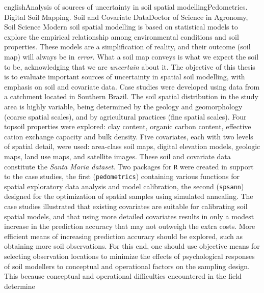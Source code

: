 \documentclass[tese, header, %
twoside, openright,          %
]{UFRuralRJ}
\begin{document}
\def\titleEn{Analysis of sources of uncertainty in soil spatial modelling}
\def\nivelEn{Doctor of Science in Agronomy, Soil Science}
\def\keyEn{Pedometrics. Digital Soil Mapping. Soil and Covariate Data}

\generalabstracttrue
\begin{generalabstract}{english}{\titleEn}{\keyEn}{\nivelEn}
Modern soil spatial modelling is based on statistical models to explore the empirical relationship among 
environmental conditions and soil properties. These models are a simplification of reality, and their outcome 
(soil map) will always be in \emph{error}. What a soil map conveys is what we expect the soil to be, 
acknowledging that we are \emph{uncertain} about it. The objective of this thesis is to evaluate important 
sources of uncertainty in spatial soil modelling, with emphasis on soil and covariate data. Case studies 
were developed using data from a catchment located in Southern Brazil. The soil spatial distribution in 
the study area is highly variable, being determined by the geology and geomorphology (coarse spatial 
scales), and by agricultural practices (fine spatial scales). Four topsoil properties were explored: clay 
content, organic carbon content, effective cation exchange capacity and bulk density. Five covariates, each 
with two levels of spatial detail, were used: area-class soil maps, digital elevation models, geologic maps, 
land use maps, and satellite images. These soil and covariate data constitute the \emph{Santa Maria dataset}. 
Two packages for \texttt{R} were created in support to the case studies, the first (\texttt{pedometrics}) 
containing various functions for spatial exploratory data analysis and model calibration, the second 
(\texttt{spsann}) designed for the optimization of spatial samples using simulated annealing. The case studies 
illustrated that existing covariates are suitable for calibrating soil spatial models, and that using more 
detailed covariates results in only a modest increase in the prediction accuracy that may not outweigh the 
extra costs. More efficient means of increasing prediction accuracy should be explored, such as obtaining more 
soil observations. For this end, one should use objective means for selecting observation locations to 
minimize the effects of psychological responses of soil modellers to conceptual and operational factors on the 
sampling design. This because conceptual and operational difficulties encountered in the field determine 

\end{generalabstract}
\end{document}
